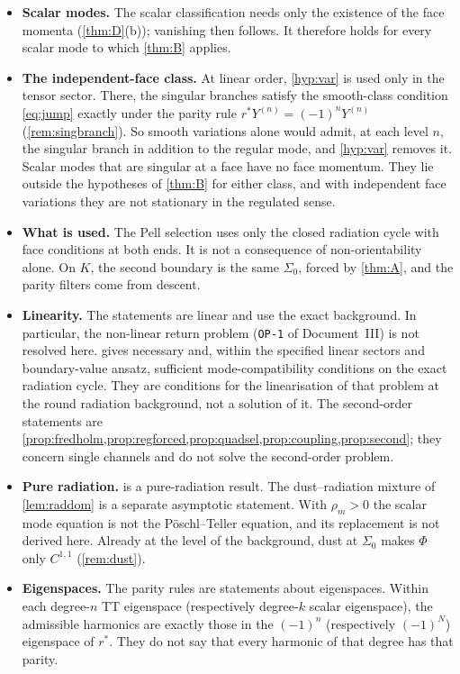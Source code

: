 \documentclass[11pt]{article}
\theoremstyle{canonmath}
\theoremstyle{canonpostulate}
\theoremstyle{canonproposition}
\theoremstyle{canonmath}
\theoremstyle{canonproposition}
\providecommand{\Klein}{\mathcal{K}}
\def\mathcal#1{#1}%
\begin{document}
\begin{itemize}
\item \textbf{Scalar modes.} The scalar classification needs only the existence of the face momenta (\cref{thm:D}(b)); vanishing then follows. It therefore holds for every scalar mode to which \cref{thm:B} applies.
\item \textbf{The independent-face class.} At linear order, \ref{hyp:var} is used only in the tensor sector. There, the singular branches satisfy the smooth-class condition \eqref{eq:jump} exactly under the parity rule $r^*Y^{(n)} = (-1)^nY^{(n)}$ (\cref{rem:singbranch}). So smooth variations alone would admit, at each level $n$, the singular branch in addition to the regular mode, and \ref{hyp:var} removes it. Scalar modes that are singular at a face have no face momentum. They lie outside the hypotheses of \cref{thm:B} for either class, and with independent face variations they are not stationary in the regulated sense.
\item \textbf{What is used.} The Pell selection uses only the closed radiation cycle with face conditions at both ends. It is not a consequence of non-orientability alone. On $\Klein$, the second boundary is the same $\Sigma_0$, forced by \cref{thm:A}, and the parity filters come from descent.
\item \textbf{Linearity.} The statements are linear and use the exact background. In particular, the non-linear return problem (\texttt{OP-1} of Document~III) is not resolved here.  gives necessary and, within the specified linear sectors and boundary-value ansatz, sufficient mode-compatibility conditions on the exact radiation cycle. They are conditions for the linearisation of that problem at the round radiation background, not a solution of it. The second-order statements are \cref{prop:fredholm,prop:regforced,prop:quadsel,prop:coupling,prop:second}; they concern single channels and do not solve the second-order problem.
\item \textbf{Pure radiation.}  is a pure-radiation result. The dust--radiation mixture of \cref{lem:raddom} is a separate asymptotic statement. With $\rho_m>0$ the scalar mode equation is not the Pöschl--Teller equation, and its replacement is not derived here. Already at the level of the background, dust at $\Sigma_0$ makes $\Phi$ only $C^{1,1}$ (\cref{rem:dust}).
\item \textbf{Eigenspaces.} The parity rules are statements about eigenspaces. Within each degree-$n$ TT eigenspace (respectively degree-$k$ scalar eigenspace), the admissible harmonics are exactly those in the $(-1)^n$ (respectively $(-1)^N$) eigenspace of $r^*$. They do not say that every harmonic of that degree has that parity.
\end{itemize}
\end{document}
